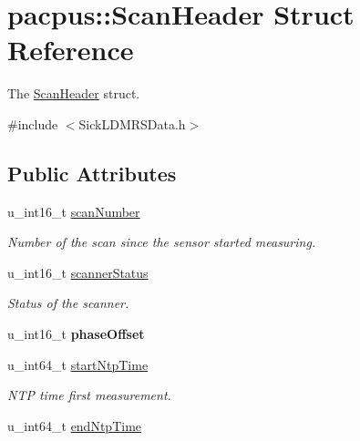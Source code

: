 \hypertarget{structpacpus_1_1ScanHeader}{\section{pacpus\-:\-:Scan\-Header Struct Reference}
\label{structpacpus_1_1ScanHeader}
}


The \hyperlink{structpacpus_1_1ScanHeader}{Scan\-Header} struct.  




{\ttfamily \#include $<$Sick\-L\-D\-M\-R\-S\-Data.\-h$>$}

\subsection*{Public Attributes}
\begin{DoxyCompactItemize}
\item 
\hypertarget{structpacpus_1_1ScanHeader_a1cf721c87e6bf8c022dc134bc1a861f1}{u\-\_\-int16\-\_\-t \hyperlink{structpacpus_1_1ScanHeader_a1cf721c87e6bf8c022dc134bc1a861f1}{scan\-Number}}\label{structpacpus_1_1ScanHeader_a1cf721c87e6bf8c022dc134bc1a861f1}

\begin{DoxyCompactList}\small\item\em Number of the scan since the sensor started measuring. \end{DoxyCompactList}\item 
u\-\_\-int16\-\_\-t \hyperlink{structpacpus_1_1ScanHeader_aad5f68bdf71fe32c0325f69919355aa7}{scanner\-Status}
\begin{DoxyCompactList}\small\item\em Status of the scanner. \end{DoxyCompactList}\item 
\hypertarget{structpacpus_1_1ScanHeader_a55369f8979b18292592fe7e63538e8b0}{u\-\_\-int16\-\_\-t {\bfseries phase\-Offset}}\label{structpacpus_1_1ScanHeader_a55369f8979b18292592fe7e63538e8b0}

\item 
\hypertarget{structpacpus_1_1ScanHeader_a498752799f73dcdea074bb346be9c909}{u\-\_\-int64\-\_\-t \hyperlink{structpacpus_1_1ScanHeader_a498752799f73dcdea074bb346be9c909}{start\-Ntp\-Time}}\label{structpacpus_1_1ScanHeader_a498752799f73dcdea074bb346be9c909}

\begin{DoxyCompactList}\small\item\em N\-T\-P time first measurement. \end{DoxyCompactList}\item 
\hypertarget{structpacpus_1_1ScanHeader_a9383aebf0708f9608d2ee0a0b4cb8c28}{u\-\_\-int64\-\_\-t \hyperlink{structpacpus_1_1ScanHeader_a9383aebf0708f9608d2ee0a0b4cb8c28}{end\-Ntp\-Time}}\label{structpacpus_1_1ScanHeader_a9383aebf0708f9608d2ee0a0b4cb8c28}


\end{DoxyCompactItemize}
